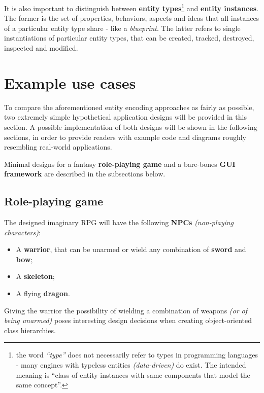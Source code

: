 \documentclass[twoside, 12pt, a4paper, openany]{book}
\begin{document}
It is also important to distinguish between \textbf{entity
types}\footnote{the word \emph{``type''} does not necessarily refer to
  types in programming languages - many engines with typeless entities
  \emph{(data-driven)} do exist. The intended meaning is ``class of
  entity instances with same components that model the same concept''.}
and \textbf{entity instances}. The former is the set of properties,
behaviors, aspects and ideas that all instances of a particular entity
type share - like a \emph{blueprint}. The latter refers to single
instantiations of particular entity types, that can be created, tracked,
destroyed, inspected and modified.

\newpage

\section{Example use cases}\label{example-use-cases}

To compare the aforementioned entity encoding approaches as fairly as
possible, two extremely simple hypothetical application designs will be
provided in this section. A possible implementation of both designs will
be shown in the following sections, in order to provide readers with
example code and diagrams roughly resembling real-world applications.

Minimal designs for a fantasy \textbf{role-playing game} and a
bare-bones \textbf{GUI framework} are described in the subsections
below.

\subsection{Role-playing game}\label{role-playing-game}

The designed imaginary RPG will have the following \textbf{NPCs}
\emph{(non-playing characters)}:

\begin{itemize}
\item
  A \textbf{warrior}, that can be unarmed or wield any combination of
  \textbf{sword} and \textbf{bow};
\item
  A \textbf{skeleton};
\item
  A flying \textbf{dragon}.
\end{itemize}

Giving the warrior the possibility of wielding a combination of weapons
\emph{(or of being unarmed)} poses interesting design decisions when
creating object-oriented class hierarchies.
\end{document}
